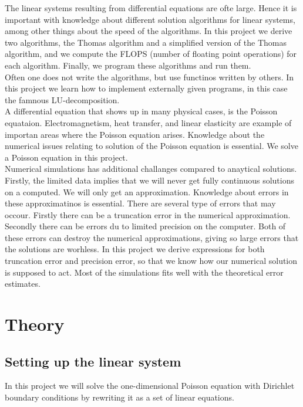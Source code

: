 \documentclass{article}
\begin{document}
The linear systems resulting from differential equations are ofte large. Hence it is important with knowledge about different solution algorithms for linear systems, among other things about the speed of the algorithms. In this project we derive two algorithms, the Thomas algorithm and a simplified version of the Thomas algorithm, and we compute the FLOPS (number of floating point operations) for each algorithm. Finally, we program these algorithms and run them.\\

Often one does not write the algorithms, but use functinos written by others. In this project we learn how to implement externally given programs, in this case the famnous LU-decomposition.\\

A differential equation that shows up in many physical cases, is the Poisson equataion. Electromagnetism, heat transfer, and linear elasticity are example of importan areas where the Poisson equation arises. Knowledge about the numerical issues relating to solution of the Poisson equation is essential. We solve a Poisson equation in this project. \\

Numerical simulations has additional challanges compared to anaytical solutions. Firstly, the limited data implies that we will never get fully continuous solutions on a computed. We will only get an approximation. Knowledge about errors in these approximatinos is essential. There are several type of errors that may occour. Firstly there can be a truncation error in the numerical approximation. Secondly there can be errors du to limited precision on the computer. Both of these errors can destroy the numerical approximations, giving so large errors that the solutions are worhless. In this project we derive expressions for both truncation error and precision error, so that we know how our numerical solution is supposed to act. Most of the simulations fits well with the theoretical error estimates.

\section{Theory}


\subsection{Setting up the linear system}
In this project we will solve the one-dimensional Poisson equation
with Dirichlet boundary conditions by rewriting it as a set of linear equations.
\end{document}
